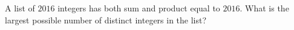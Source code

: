 A list of $2016$ integers has both sum and product equal to $2016$. What is the largest possible number of distinct integers in the list?

